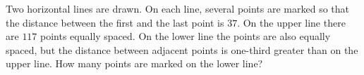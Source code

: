 Two horizontal lines are drawn. On each line, several points are marked so that the distance between the first and the last point is $37$. On the upper line there are $117$ points equally spaced. On the lower line the points are also equally spaced, but the distance between adjacent points is one-third greater than on the upper line. How many points are marked on the lower line?
